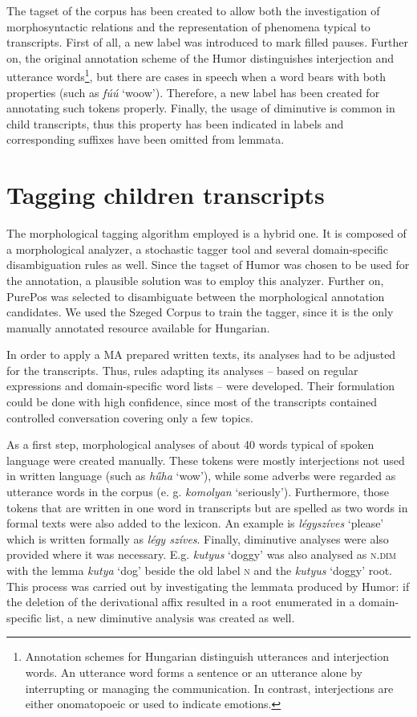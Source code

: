 The tagset of the corpus has been created to allow both the investigation of morphosyntactic relations and the representation of phenomena typical to transcripts. 
First of all, a new label was introduced to mark filled pauses. 
Further on, the original annotation scheme of the Humor distinguishes interjection and utterance words\footnote{Annotation schemes for Hungarian distinguish utterances and interjection words. An utterance word forms a sentence or an utterance alone by interrupting or managing the communication. In contrast, interjections are either onomatopoeic or used to indicate emotions.},
but there are cases in speech when a word bears with both properties (such as \textit{fúú} `woow’). 
Therefore, a new label has been created for annotating such tokens properly. 
Finally, the usage of diminutive is common in child transcripts, thus this property has been indicated in labels and corresponding suffixes have been omitted from lemmata.

\section{Tagging children transcripts}
\label{sec:tagging}
The morphological tagging algorithm employed is a hybrid one. 
It is composed of a morphological analyzer, a stochastic tagger tool and several domain-specific disambiguation rules as well. 
Since the tagset of Humor was chosen to be used for the annotation, a plausible solution was to employ this analyzer. 
Further on, PurePos was selected to disambiguate between the morphological annotation candidates. 
We used the Szeged Corpus to train the tagger, since it is the only manually annotated resource available for Hungarian. 

In order to apply a MA prepared written texts, its analyses had to be adjusted for the transcripts. 
Thus, rules adapting its analyses -- based on regular expressions and domain-specific word lists -- were developed.
Their formulation could be done with high confidence, since most of the transcripts contained controlled conversation covering only a few topics. 

As a first step, morphological analyses of about 40 words typical of spoken language were created manually. 
These tokens were mostly interjections not used in written language (such as \textit{hűha} `wow’), while some adverbs were regarded as utterance words in the corpus (e. g. \textit{komolyan} `seriously’). 
Furthermore, those tokens that are written in one word in transcripts but are spelled as two words in formal texts were also added to the lexicon. 
An example is \textit{légyszíves} `please’ which is written formally as \textit{légy szíves}. Finally, diminutive analyses were also provided where it was necessary. 
E.g. \textit{kutyus} `doggy’ was also analysed as \textsc{n.dim} with the lemma \textit{kutya} `dog’ beside the old label \textsc{n} and the \textit{kutyus} `doggy’ root. This process was carried out by investigating the lemmata produced by Humor: if the deletion of the derivational affix resulted in a root enumerated in a domain-specific list, a new diminutive analysis was created as well. 

